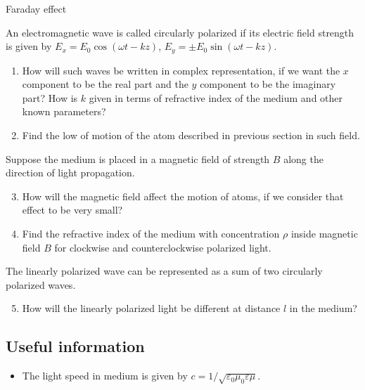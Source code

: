 \begin{enumerate}
{\bfseries
\item Faraday effect
}

\hspace{.5cm}
An electromagnetic wave is called circularly polarized
if its electric field strength is given by
$E_x = E_0 \cos(\omega t - k z)$, $E_y = \pm E_0 \sin(\omega t - k z)$.

\begin{enumerate}
    \item How will such waves be written in complex representation,
    if we want the $x$ component to be the real part
    and the $y$ component to be the imaginary part?
    How is $k$ given in terms of refractive index of the medium
    and other known parameters?

    \item Find the low of motion of the atom
    described in previous section in such field.
\end{enumerate}

\hspace{.5cm}
Suppose the medium is placed in a magnetic field of strength $B$
along the direction of light propagation.

\begin{enumerate}
    \setcounter{enumii}{2}
    \item How will the magnetic field affect the motion of atoms,
    if we consider that effect to be very small?

    \item Find the refractive index of the medium with concentration $\rho$
    inside magnetic field $B$ for clockwise and counterclockwise polarized light.
\end{enumerate}

The linearly polarized wave can be represented as
a sum of two circularly polarized waves.

\begin{enumerate}
    \setcounter{enumii}{4}
    \item How will the linearly polarized light be different
    at distance $l$ in the medium?
\end{enumerate}

\end{enumerate}

\subsection*{Useful information}
\begin{itemize}
    \item The light speed in medium is given by
    $c = 1/\sqrt{\varepsilon_0 \mu_0 \varepsilon \mu}$.
\end{itemize}

